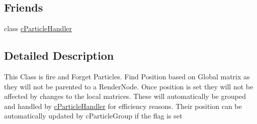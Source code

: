 \subsection*{Friends}
\begin{DoxyCompactItemize}
\item 
\hypertarget{classc_particle_ad810bc5f0330a0154ffaabe8d256379c}{
class \hyperlink{classc_particle_ad810bc5f0330a0154ffaabe8d256379c}{cParticleHandler}}
\label{classc_particle_ad810bc5f0330a0154ffaabe8d256379c}

\end{DoxyCompactItemize}


\subsection{Detailed Description}
This Class is fire and Forget Particles. Find Position based on Global matrix as they will not be parented to a RenderNode. Once position is set they will not be affected by changes to the local matrices. These will automatically be grouped and handled by \hyperlink{classc_particle_handler}{cParticleHandler} for efficiency reasons. Their position can be automatically updated by cParticleGroup if the flag is set 